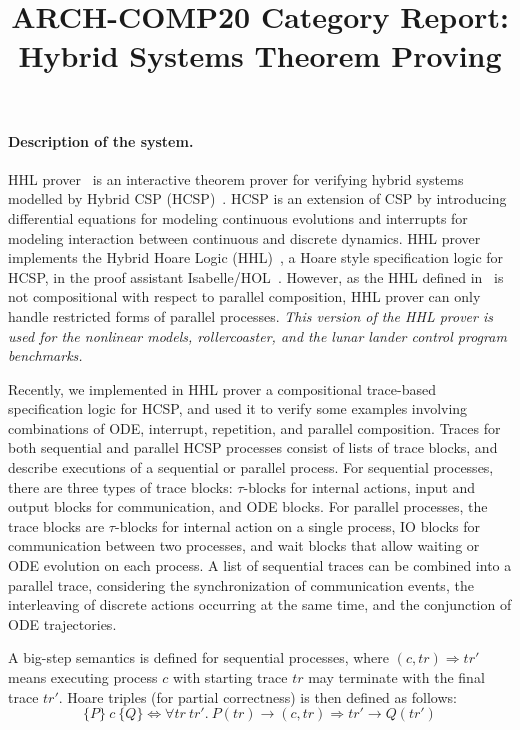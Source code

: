 \documentclass[runningheads,a4paper]{llncs}
\begin{document}
\author{}
\institute{}

\title{ARCH-COMP20 Category Report: Hybrid Systems Theorem Proving}

\maketitle

\paragraph{Description of the system.}

HHL prover~\cite{WZZ15} is an interactive theorem prover for verifying
hybrid systems modelled by Hybrid CSP (HCSP)~\cite{He94,ZWR96}. HCSP is an extension of CSP by introducing differential equations for modeling continuous evolutions and interrupts for modeling interaction between continuous and discrete dynamics.  HHL prover implements the Hybrid Hoare Logic (HHL)~\cite{LLQZ10}, a Hoare style specification logic for HCSP, in the proof assistant Isabelle/HOL~\cite{isabelle}. However, as the HHL defined in~\cite{LLQZ10} is not compositional with respect to 
parallel composition, HHL prover can only handle restricted forms of parallel processes. \emph{This version of the HHL prover is used for the nonlinear models, rollercoaster, and the lunar lander control program benchmarks.}

Recently, we implemented in HHL prover a compositional trace-based specification logic for HCSP, and used it to verify some examples involving combinations of ODE, interrupt, repetition, and parallel composition. Traces for both sequential and parallel HCSP processes consist of lists of trace blocks, and describe executions of a sequential or parallel process. For sequential processes, there are three types of trace blocks: $\tau$-blocks for internal actions, input and output blocks for communication, and ODE blocks. For parallel processes, the trace blocks are $\tau$-blocks for internal action on a single process, IO blocks for communication between two processes, and wait blocks that allow waiting or ODE evolution on each process. A list of sequential traces can be combined into a parallel trace, considering the synchronization of communication events, the interleaving of discrete actions occurring at the same time, and the conjunction of ODE trajectories.

A big-step semantics is defined for sequential processes, where $(c,tr)\Rightarrow tr'$ means executing process $c$ with starting trace $tr$ may terminate with the final trace $tr'$. Hoare triples (for partial correctness) is then defined as follows:
\[\{P\}~ c ~\{Q\} \Longleftrightarrow \forall tr\ tr'.\ P(tr) \longrightarrow (c,tr)\Rightarrow tr' \longrightarrow Q(tr') \]
\end{document}
